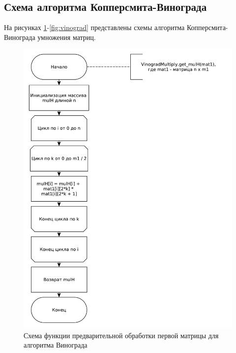 \documentclass[a4paper,oneside,14pt]{extreport}
\begin{document}
\subsection{Схема алгоритма Копперсмита-Винограда}
На рисунках \ref{fig:vin_mulh}-\ref{fig:vinograd} представлены схемы алгоритма Копперсмита-Винограда умножения матриц.

\captionsetup{justification=centering, singlelinecheck=false}

\begin{figure}[H]
	\centering
	\includegraphics[width=0.9\linewidth]{images/vinograd_get_mulh}
	\caption{Схема функции предварительной обработки первой матрицы для алгоритма Винограда}
	\label{fig:vin_mulh}
\end{figure}
\end{document}
